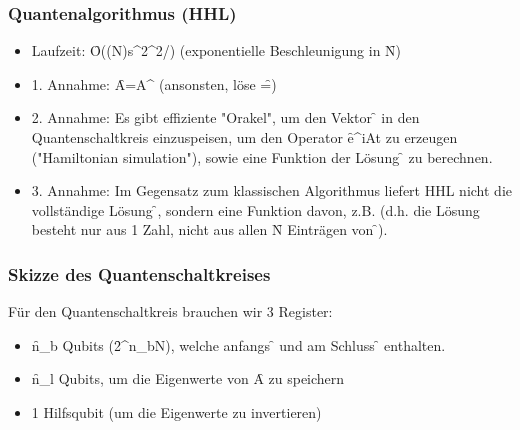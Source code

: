 \subsubsection{Quantenalgorithmus (HHL)}
\begin{itemize}
    \item Laufzeit: \f{O(\log(N)s^2\kappa^2/\epsilon)} (exponentielle Beschleunigung in \f{N})
    \item 1. Annahme: \f{A=A^\dagger} (ansonsten, löse \f{=})
    \item 2. Annahme: Es gibt effiziente "Orakel", um den Vektor \f{} in den Quantenschaltkreis einzuspeisen, um den Operator \f{e^{iAt}} zu erzeugen ("Hamiltonian simulation"), sowie eine Funktion der Lösung \f{} zu berechnen.
    \item 3. Annahme: Im Gegensatz zum klassischen Algorithmus liefert HHL nicht die vollständige Lösung \f{}, sondern eine Funktion davon, z.B.
    (d.h. die Lösung besteht nur aus 1 Zahl, nicht aus allen \f{N} Einträgen von \f{}).
\end{itemize}

\subsubsection{Skizze des Quantenschaltkreises}
Für den Quantenschaltkreis brauchen wir 3 Register:
\begin{itemize}
    \item \f{n_b} Qubits (\f{2^{n_b}\geq N}), welche anfangs \f{} und am Schluss \f{} enthalten.
    \item \f{n_l} Qubits, um die Eigenwerte von \f{A} zu speichern
    \item 1 Hilfsqubit (um die Eigenwerte zu invertieren)
\end{itemize}

